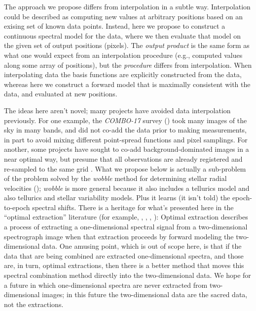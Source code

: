 \documentclass[modern]{aastex631}
\begin{document}

The approach we propose differs from interpolation in a subtle way. 
Interpolation could be described as computing new values at arbitrary positions based on an exising set of known data points. 
Instead, here we propose to construct a continuous spectral model for the data, where we then evaluate that model on the given set of output positions (pixels).
The \emph{output product} is the same form as what one would expect from an interpolation procedure (e.g., computed values along some array of positions), but the \emph{procedure} differs from interpolation. When interpolating data the basis functions are explicitly constructed from the data, whereas here we construct a forward model that is maximally consistent with the data, and evaluated at new positions.

The ideas here aren't novel; many projects have avoided data interpolation previously.
For one example, the \textsl{COMBO-17} survey (\citealt{combo17}) took many images of the sky in many bands, and did not co-add the data prior to making measurements, in part to avoid mixing different point-spread functions and pixel samplings.
For another, some projects have sought to co-add background-dominated images in a near optimal way, but presume that all observations are already registered and re-sampled to the same grid \citep{zackay}.
What we propose below is actually a sub-problem of the problem solved by the \textsl{wobble} method for determining stellar radial velocities (\citealt{wobble}); \textsl{wobble} is more general because it also includes a tellurics model and also tellurics and stellar variability models.
Plus it learns (it isn't told) the epoch-to-epoch spectral shifts.
There is a heritage for what's presented here in the ``optimal extraction'' literature (for example, \citealt{oe}, \citealt{kelson}, \citealt{froe}, \citealt{sp}):
Optimal extraction describes a process of extracting a one-dimensional spectral signal from a two-dimensional spectrograph image when that extraction proceeds by forward modeling the two-dimensional data.
One amusing point, which is out of scope here, is that if the data that are being combined are extracted one-dimensional spectra, and those are, in turn, optimal extractions, then there is a better method that moves this spectral combination method directly into the two-dimensional data.
We hope for a future in which one-dimensional spectra are never extracted from two-dimensional images; in this future the two-dimensional data are the sacred data, not the extractions.
\end{document}
